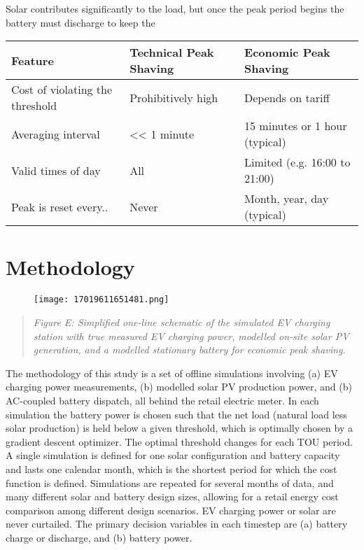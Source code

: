 \documentclass[
]{article}
\begin{document}
Solar contributes significantly to the load, but once the peak period
begins the battery must discharge to keep the

\begin{longtable}[]{@{}lll@{}}
\toprule
Feature & Technical Peak Shaving & Economic Peak Shaving\tabularnewline
\midrule
\endhead
Cost of violating the threshold & Prohibitively high & Depends on
tariff\tabularnewline
Averaging interval & \textless\textless{} 1 minute & 15 minutes or 1
hour (typical)\tabularnewline
Valid times of day & All & Limited (e.g. 16:00 to 21:00)\tabularnewline
Peak is reset every.. & Never & Month, year, day
(typical)\tabularnewline
\bottomrule
\end{longtable}

\hypertarget{methodology}{%
\section{Methodology}\label{methodology}}

\begin{figure}
\centering
\texttt{[image: 17019611651481.png]}
\caption{}
\end{figure}

\begin{quote}
\emph{Figure E: Simplified one-line schematic of the simulated EV
charging station with true measured EV charging power, modelled on-site
solar PV generation, and a modelled stationary battery for economic peak
shaving.}
\end{quote}

The methodology of this study is a set of offline simulations involving
(a) EV charging power measurements, (b) modelled solar PV production
power, and (b) AC-coupled battery dispatch, all behind the retail
electric meter. In each simulation the battery power is chosen such that
the net load (natural load less solar production) is held below a given
threshold, which is optimally chosen by a gradient descent optimizer.
The optimal threshold changes for each TOU period. A single simulation
is defined for one solar configuration and battery capacity and lasts
one calendar month, which is the shortest period for which the cost
function is defined. Simulations are repeated for several months of
data, and many different solar and battery design sizes, allowing for a
retail energy cost comparison among different design scenarios. EV
charging power or solar are never curtailed. The primary decision
variables in each timestep are (a) battery charge or discharge, and (b)
battery power.
\end{document}
